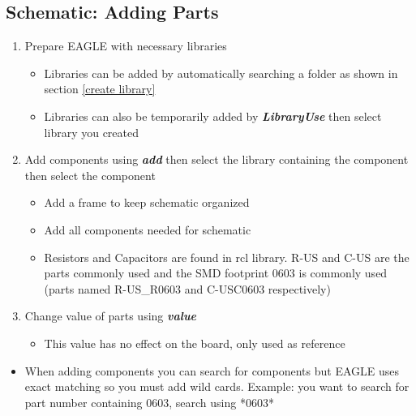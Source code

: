 \documentclass{article}
\begin{document}
\subsection{Schematic: Adding Parts}
\begin{enumerate}
    \item Prepare EAGLE with necessary libraries
    \begin{itemize}
        \item Libraries can be added by automatically searching a folder as shown in section \ref{create library}
        \item Libraries can also be temporarily added by \textit{\textbf{Library\textrightarrow Use}} then select library you created
    \end{itemize}
    \item Add components using \textit{\textbf{add}} then select the library containing the component then select the component
    \begin{itemize}
        \item Add a frame to keep schematic organized
        \item Add all components needed for schematic
        \item Resistors and Capacitors are found in rcl library. R-US and C-US are the parts commonly used and the SMD footprint 0603 is commonly used (parts named R-US\_R0603 and C-USC0603 respectively)
    \end{itemize}
    \item Change value of parts using \textit{\textbf{value}}
    \begin{itemize}
        \item This value has no effect on the board, only used as reference
    \end{itemize}
\end{enumerate}
\begin{tcolorbox} [title=Tips \& Tricks]
    \begin{itemize}
        \item When adding components you can search for components but EAGLE uses exact matching so you must add wild cards. Example: you want to search for part number containing 0603, search using *0603*
    \end{itemize}
\end{tcolorbox}
\end{document}
